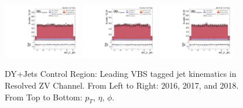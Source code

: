 \begin{figure}[!ht]
  \includegraphics[width=0.30\textwidth]{analysis_plots/2016_zjj/cr_vjets_l/vbf_j1_phi.pdf}
  \includegraphics[width=0.30\textwidth]{analysis_plots/2017_zjj/cr_vjets_l/vbf_j1_phi.pdf}
  \includegraphics[width=0.30\textwidth]{analysis_plots/2018_zjj/cr_vjets_l/vbf_j1_phi.pdf} \\
  \caption[DY+Jets Control Region: Leading VBS tagged jet kinematics in Resolved ZV Channel]%
  {DY+Jets Control Region: Leading VBS tagged jet kinematics in Resolved ZV Channel. From Left to Right: 2016,
    2017, and 2018. From Top to Bottom: \( p_T \), \( \eta \), \( \phi \).}%
  \label{fig:zjj-cr-vjets-l-vbs1-pt-eta-m}
\end{figure}

